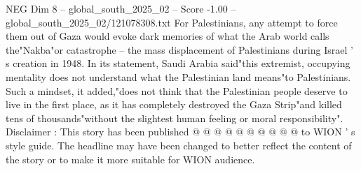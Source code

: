 \begin{textsample}{NEG Dim 8 – global\_south\_2025\_02 – Score -1.00 – global\_south\_2025\_02/121078308.txt}
For Palestinians, any attempt to force them out of Gaza would evoke dark memories of what the Arab world calls the"Nakba"or catastrophe -- the mass displacement of Palestinians during Israel ' s creation in 1948.
In its statement, Saudi Arabia said"this extremist, occupying mentality does not understand what the Palestinian land means"to Palestinians.
Such a mindset, it added,"does not think that the Palestinian people deserve to live in the first place, as it has completely destroyed the Gaza Strip"and killed tens of thousands"without the slightest human feeling or moral responsibility".
Disclaimer : This story has been published @ @ @ @ @ @ @ @ @ @ to WION ' s style guide.
The headline may have been changed to better reflect the content of the story or to make it more suitable for WION audience.

\end{textsample}
